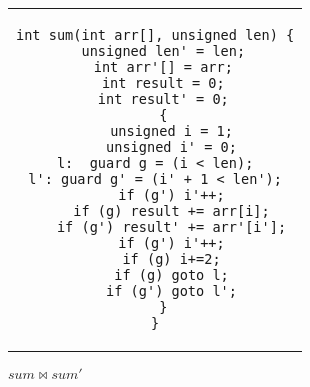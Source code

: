 \begin{figure}
\centering
\begin{tabular}{c}
\begin{lstlisting}
int sum(int arr[], unsigned len) {
  unsigned len' = len;
  int arr'[] = arr;
  int result = 0;
  int result' = 0;
  {
    unsigned i = 1;
    unsigned i' = 0;
l:  guard g = (i < len);
l': guard g' = (i' + 1 < len');
    if (g') i'++;
    if (g) result += arr[i];
    if (g') result' += arr'[i'];
    if (g') i'++;
    if (g) i+=2;
    if (g) goto l;
    if (g') goto l';
  }
}
\end{lstlisting}
\end{tabular}
\caption{$sum \bowtie sum'$}
\end{figure} 